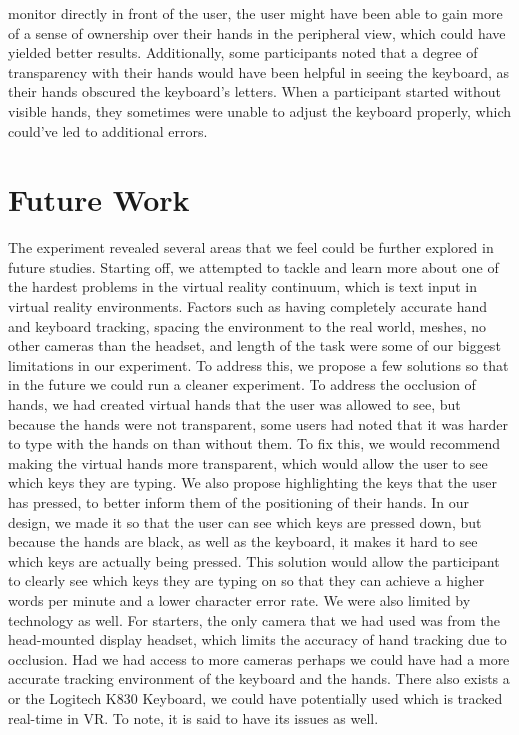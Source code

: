\documentclass[acmlarge]{acmart}
\begin{document}
monitor directly in front of the user, the user might have been able to gain more of a sense of ownership over their hands in the peripheral view, which could have yielded better results. Additionally, some participants noted that a degree of transparency with their hands would have been helpful in seeing the keyboard, as their hands obscured the keyboard's letters. When a participant started without visible hands, they sometimes were unable to adjust the keyboard properly, which could've led to additional errors. 

\section{Future Work}
The experiment revealed several areas that we feel could be further explored in future studies. Starting off, we attempted to tackle and learn more about one of the hardest problems in the virtual reality continuum, which is text input in virtual reality environments. Factors such as having completely accurate hand and keyboard tracking, spacing the environment to the real world, meshes, no other cameras than the headset, and length of the task were some of our biggest limitations in our experiment. To address this, we propose a few solutions so that in the future we could run a cleaner experiment. To address the occlusion of hands, we had created virtual hands that the user was allowed to see, but because the hands were not transparent, some users had noted that it was harder to type with the hands on than without them. To fix this, we would recommend making the virtual hands more transparent, which would allow the user to see which keys they are typing. We also propose highlighting the keys that the user has pressed, to better inform them of the positioning of their hands. In our design, we made it so that the user can see which keys are pressed down, but because the hands are black, as well as the keyboard, it makes it hard to see which keys are actually being pressed. This solution would allow the participant to clearly see which keys they are typing on so that they can achieve a higher words per minute and a lower character error rate. We were also limited by technology as well. For starters, the only camera that we had used was from the head-mounted display headset, which limits the accuracy of hand tracking due to occlusion. Had we had access to more cameras perhaps we could have had a more accurate tracking environment of the keyboard and the hands. There also exists a  or the Logitech K830 Keyboard, we could have potentially used which is tracked real-time in  VR. To note, it is said to have its issues as well.   
\end{document}
